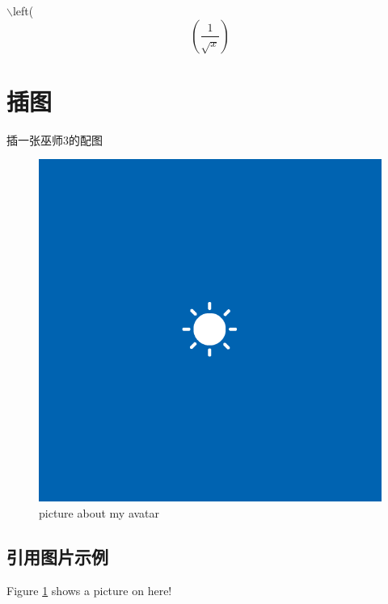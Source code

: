 $\backslash$left(
\begin{equation}
\left( \frac{1}{\sqrt{x}} \right)
\end{equation}
\section{插图}
插一张巫师3的配图
\begin{figure}[h!]
	\includegraphics[width=\linewidth]{avatar.png}
	\caption{picture about my avatar}
	\label{fig:qqavatar}
\end{figure}  

\subsection{引用图片示例 }
Figure \ref{fig:qqavatar} shows a picture on here!
